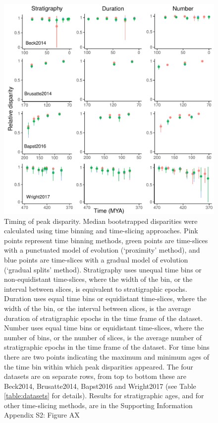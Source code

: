 \documentclass[12pt,a4paper]{article}
\begin{document}
  \begin{figure}[!htbp]
    \centering
    \includegraphics[width=1\linewidth, height=1\textheight, keepaspectratio]{figures/fig-dtt-epoch.pdf}
    \caption[Timing of peak disparity for four example datasets.]
    {Timing of peak disparity.
    Median bootstrapped disparities were calculated using time binning and time-slicing approaches. 
    Pink points represent time binning methods, green points are time-slices with a punctuated model of evolution (`proximity' method), and blue points are time-slices with a gradual model of evolution (`gradual splits' method). 
    Stratigraphy uses unequal time bins or non-equidistant time-slices, where the width of the bin, or the interval between slices, is equivalent to stratigraphic epochs. 
    Duration uses equal time bins or equidistant time-slices, where the width of the bin, or the interval between slices, is the average duration of stratigraphic epochs in the time frame of the dataset. 
    Number uses equal time bins or equidistant time-slices, where the number of bins, or the number of slices, is the average number of stratigraphic epochs in the time frame of the dataset. 
    For time bins there are two points indicating the maximum and minimum ages of the time bin within which peak disparities appeared.
    The four datasets are on separate rows, from top to bottom these are Beck2014, Brusatte2014, Bapst2016 and Wright2017 (see Table \ref{table:datasets} for details).
    Results for stratigraphic ages, and for other time-slicing methods, are in the Supporting Information Appendix S2: Figure AX} %
    \label{figure:peak1}
  \end{figure}
\end{document}
